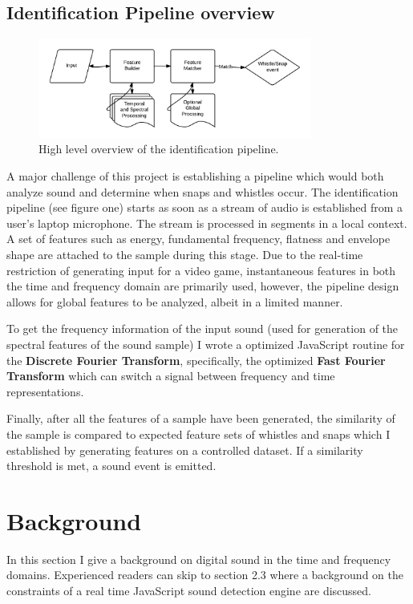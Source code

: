 \documentclass[DIV=calc, paper=a4, fontsize=11pt, twocolumn]{scrartcl}   %
\begin{document}
\subsection{Identification Pipeline overview}
\begin{figure}[h]
\centering
\includegraphics[width=90mm]{figures/HighLevelPipeline.png}
\caption{High level overview of the identification pipeline.}
\label{overflow}
\end{figure}
A major challenge of this project is establishing a pipeline which would both analyze sound and determine when snaps and whistles occur. The identification pipeline (see figure one) starts as soon as a stream of audio is established from a user's laptop microphone. The stream is processed in segments in a local context. A set of features such as energy, fundamental frequency, flatness and envelope shape are attached to the sample during this stage. Due to the real-time restriction of generating input for a video game, instantaneous features in both the time and frequency domain are primarily used, however, the pipeline design allows for global features to be analyzed, albeit in a limited manner.
\par To get the frequency information of the input sound (used for generation of the spectral features of the sound sample) I wrote a optimized JavaScript routine for the \textbf{Discrete Fourier Transform}, specifically, the optimized \textbf{Fast Fourier Transform}  which can switch a signal between frequency and time representations.
\par Finally, after all the features of a sample have been generated, the similarity of the sample is compared to expected feature sets of whistles and snaps which I established by generating features on a controlled dataset. If a similarity threshold is met, a sound event is emitted.





\section{Background}
In this section I give a background on digital sound in the time and frequency domains. Experienced readers can skip to section 2.3 where a background on the constraints of a real time JavaScript sound detection engine are discussed.
\end{document}

